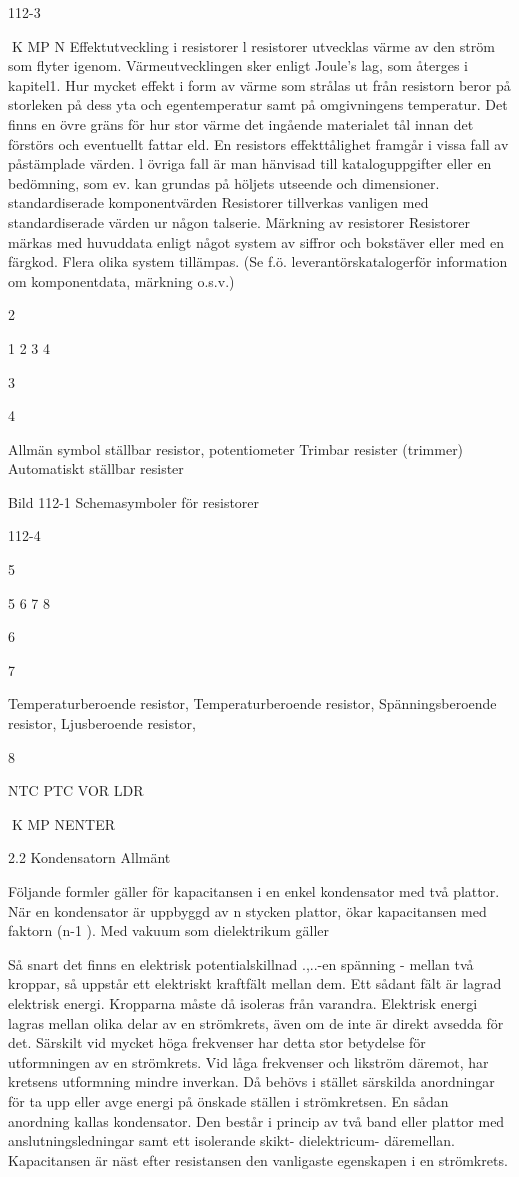 112-3

K MP N
Effektutveckling i resistorer
l resistorer utvecklas värme av den ström
som flyter igenom. Värmeutvecklingen sker
enligt Joule's lag, som återges i kapitel1.
Hur mycket effekt i form av värme som
strålas ut från resistorn beror på storleken på
dess yta och egentemperatur samt på omgivningens temperatur. Det finns en övre
gräns för hur stor värme det ingående materialet tål innan det förstörs och eventuellt
fattar eld.
En resistors effekttålighet framgår i vissa
fall av påstämplade värden. l övriga fall är
man hänvisad till kataloguppgifter eller en
bedömning, som ev. kan grundas på höljets
utseende och dimensioner.
standardiserade komponentvärden
Resistorer tillverkas vanligen med standardiserade värden ur någon talserie.
Märkning av resistorer
Resistorer märkas med huvuddata enligt
något system av siffror och bokstäver eller
med en färgkod. Flera olika system tillämpas.
(Se f.ö. leverantörskatalogerför information
om komponentdata, märkning o.s.v.)

2

1
2
3
4

3

4

Allmän symbol
ställbar resistor, potentiometer
Trimbar resister (trimmer)
Automatiskt ställbar resister

Bild 112-1 Schemasymboler för resistorer

112-4

5

5
6
7
8

6

7

Temperaturberoende resistor,
Temperaturberoende resistor,
Spänningsberoende resistor,
Ljusberoende resistor,

8

NTC
PTC
VOR
LDR

K MP NENTER

2.2 Kondensatorn
Allmänt

Följande formler gäller för kapacitansen i
en enkel kondensator med två plattor. När
en kondensator är uppbyggd av n stycken
plattor, ökar kapacitansen med faktorn (n-1 ).
Med vakuum som dielektrikum gäller

Så snart det finns en elektrisk potentialskillnad .,..-en spänning - mellan två kroppar, så
uppstår ett elektriskt kraftfält mellan dem.
Ett sådant fält är lagrad elektrisk energi.
Kropparna måste då isoleras från varandra.
Elektrisk energi lagras mellan olika delar
av en strömkrets, även om de inte är direkt
avsedda för det. Särskilt vid mycket höga
frekvenser har detta stor betydelse för utformningen av en strömkrets. Vid låga frekvenser och likström däremot, har kretsens
utformning mindre inverkan. Då behövs i
stället särskilda anordningar för ta upp eller
avge energi på önskade ställen i strömkretsen.
En sådan anordning kallas kondensator.
Den består i princip av två band eller plattor
med anslutningsledningar samt ett isolerande skikt- dielektricum- däremellan.
Kapacitansen är näst efter resistansen
den vanligaste egenskapen i en strömkrets.

